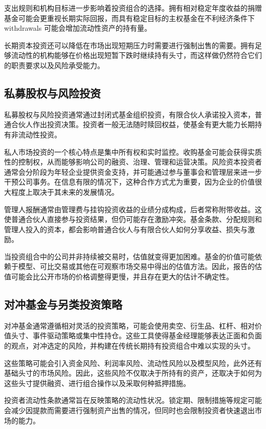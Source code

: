 支出规则和机构目标进一步影响着投资组合的选择。拥有相对稳定年度收益的捐赠基金可能会更重视长期实际回报，而具有稳定目标的主权基金在不利经济条件下 withdrawals 可能会增加流动性资产的持有量。

长期资本投资还可以降低在市场出现短期压力时需要进行强制出售的需要。拥有足够流动性的机构能够在价格出现短暂下跌时继续持有头寸，而这样做仍然符合它们的职责要求以及风险承受能力。

\subsection{私募股权与风险投资}

私募股权与风险投资通常通过封闭式基金组织投资，有限合伙人承诺投入资本，普通合伙人作出投资决策。投资者一般无法随时赎回权益，使基金有更大能力长期持有非流动性投资。

私人市场投资的一个核心特点是集中所有权和实时监控。收购基金可能会获得实质性的控制权，从而能够影响公司的融资、治理、管理和运营决策。风险资本投资者通常会分阶段为年轻企业提供资金支持，并可能通过参与董事会和管理层来进一步干预公司事务。在信息有限的情况下，这种合作方式尤为重要，因为企业的价值很大程度上取决于其未来的发展情况。

管理人报酬通常由管理费与挂钩投资收益的业绩分成构成，后者常称附带收益。这使普通合伙人直接参与投资结果，但仍可能存在激励冲突。基金条款、分配规则和管理人投入的资本，都会影响普通合伙人与有限合伙人如何分享收益、损失与激励。

当投资组合中的公司并非持续被交易时，估值就变得更加困难。基金的价值可能依赖于模型、可比交易或其他在可观察市场交易中得出的估值方法。因此，报告的估值可能会比公开市场的价格调整得更慢，并且存在更大的估计不确定性。

\subsection{对冲基金与另类投资策略}

对冲基金通常遵循相对灵活的投资策略，可能会使用卖空、衍生品、杠杆、相对价值头寸、事件驱动策略或集中性持仓。这些工具使得基金经理能够表达正面和负面的观点，对冲选定的风险，并构建在传统长期持有投资组合中难以实现的头寸。

这些策略可能会引入资金风险、利润率风险、流动性风险以及模型风险，此外还有基础头寸的市场风险。因此，这些风险不仅取决于所持有的资产，还取决于如何为这些头寸提供融资、进行组合操作以及采取何种抵押措施。

投资者流动性条款通常旨在反映策略的流动性状况。锁定期、限制措施等规定可能会减少因提款而需要进行强制资产出售的情况，但同时也会限制投资者快速退出市场的能力。

